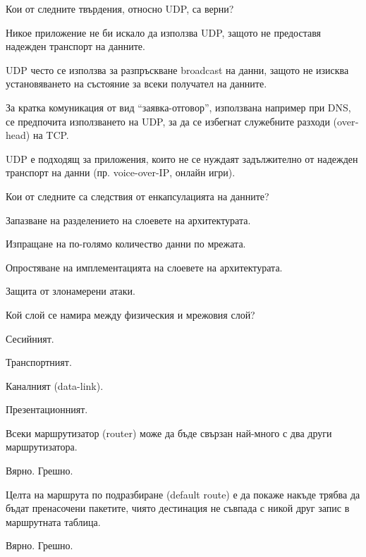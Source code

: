 \begin{questions}
  \question[7] Кои от следните твърдения, относно UDP, са верни?
  \begin{choices}
    \choice Никое приложение не би искало да използва UDP, защото не предоставя
    надежден транспорт на данните.

    \CorrectChoice UDP често се използва за разпръскване
    \foreignlanguage{english}{broadcast} на данни, защото не изисква
    установяването на състояние за всеки получател на данните.

    \CorrectChoice За кратка комуникация от вид "`заявка-отговор"', използвана
    например при DNS, се предпочита използването на UDP, за да се избегнат
    служебните разходи (\foreignlanguage{english}{overhead}) на TCP.

    \CorrectChoice UDP е подходящ за приложения, които не се нуждаят
    задължително от надежден транспорт на данни
    (пр. \foreignlanguage{english}{voice-over-IP}, онлайн игри).
  \end{choices}

  \question[6] Кои от следните са следствия от енкапсулацията на данните?
  \begin{choices}
    \CorrectChoice Запазване на разделението на слоевете на архитектурата.

    \choice Изпращане на по-голямо количество данни по мрежата.

    \CorrectChoice Опростяване на имплементацията на слоевете на архитектурата.

    \choice Защита от злонамерени атаки.
  \end{choices}

  \question[6] Кой слой се намира между физическия и мрежовия слой?
  \begin{oneparchoices}
    \choice Сесийният.

    \choice Транспортният.

    \CorrectChoice Каналният (\foreignlanguage{english}{data-link}).

    \choice Презентационният.
  \end{oneparchoices}

  \question[6] Всеки маршрутизатор (\foreignlanguage{english}{router}) може да
  бъде свързан най-много с два други маршрутизатора.
  \begin{oneparchoices}
    \choice Вярно.
    \CorrectChoice Грешно.
  \end{oneparchoices}

  \question[6] Целта на маршрута по подразбиране
  (\foreignlanguage{english}{default route}) е да покаже накъде трябва да бъдат
  пренасочени пакетите, чиято дестинация не съвпада с никой друг запис в
  маршрутната таблица.
  \begin{oneparchoices}
    \CorrectChoice Вярно.
    \choice Грешно.
  \end{oneparchoices}


\end{questions}
